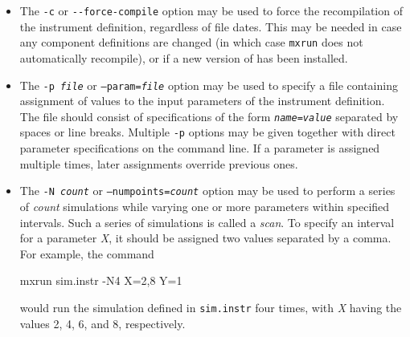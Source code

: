 \begin{itemize}
\item The \verb+-c+ or \verb+--force-compile+ option may be used to force the
  recompilation of the instrument definition, regardless of file dates. This may
  be needed in case any component definitions are changed (in which case
  \verb+mxrun+ does not automatically recompile), or if a new version of \MCX
  has been installed.
\item The \texttt{-p \textit{file}} or \texttt{--param=\textit{file}} option may be
  used to specify a file containing assignment of values to the input parameters
  of the instrument definition. The file should consist of specifications of the
  form \texttt{\textit{name\/}=\textit{value\/}} separated by spaces or line
  breaks. Multiple \verb+-p+ options may be given together with direct parameter
  specifications on the command line. If a parameter is assigned multiple times,
  later assignments override previous ones.
\item The \texttt{-N \textit{count}} or \texttt{--numpoints=\textit{count}} option
  may be used to perform a series of \textit{count\/} simulations while
  varying one or more parameters within specified intervals. Such a
  series of simulations is called a \emph{scan}. To specify
  an interval for a parameter \textit{X}, it should be assigned two
  values separated by a comma. For example, the command
\begin{bash}
mxrun sim.instr -N4 X=2,8 Y=1
\end{bash}
would run the simulation defined in \verb+sim.instr+ four times, with
\textit{X} having the values 2, 4, 6, and 8, respectively.


\end{itemize}
